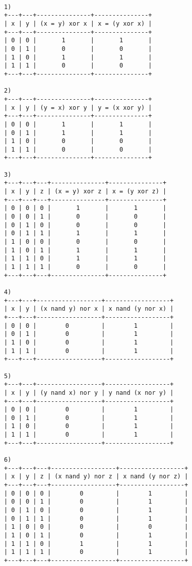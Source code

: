 \documentclass{article}
\begin{document}
\begin{verbatim}

1)
+---+---+---------------+---------------+
| x | y | (x = y) xor x | x = (y xor x) |
+---+---+---------------+---------------+
| 0 | 0 |       1       |       1       |
| 0 | 1 |       0       |       0       |
| 1 | 0 |       1       |       1       |
| 1 | 1 |       0       |       0       |
+---+---+---------------+---------------+

2)
+---+---+---------------+---------------+
| x | y | (y = x) xor y | y = (x xor y) |
+---+---+---------------+---------------+
| 0 | 0 |       1       |       1       |
| 0 | 1 |       1       |       1       |
| 1 | 0 |       0       |       0       |
| 1 | 1 |       0       |       0       |
+---+---+---------------+---------------+

3)
+---+---+---+---------------+---------------+
| x | y | z | (x = y) xor z | x = (y xor z) |
+---+---+---+---------------+---------------+
| 0 | 0 | 0 |       1       |       1       |
| 0 | 0 | 1 |       0       |       0       |
| 0 | 1 | 0 |       0       |       0       |
| 0 | 1 | 1 |       1       |       1       |
| 1 | 0 | 0 |       0       |       0       |
| 1 | 0 | 1 |       1       |       1       |
| 1 | 1 | 0 |       1       |       1       |
| 1 | 1 | 1 |       0       |       0       |
+---+---+---+---------------+---------------+

4)
+---+---+------------------+------------------+
| x | y | (x nand y) nor x | x nand (y nor x) |
+---+---+------------------+------------------+
| 0 | 0 |        0         |        1         |
| 0 | 1 |        0         |        1         |
| 1 | 0 |        0         |        1         |
| 1 | 1 |        0         |        1         |
+---+---+------------------+------------------+

5)
+---+---+------------------+------------------+
| x | y | (y nand x) nor y | y nand (x nor y) |
+---+---+------------------+------------------+
| 0 | 0 |        0         |        1         |
| 0 | 1 |        0         |        1         |
| 1 | 0 |        0         |        1         |
| 1 | 1 |        0         |        1         |
+---+---+------------------+------------------+

6)
+---+---+---+------------------+------------------+
| x | y | z | (x nand y) nor z | x nand (y nor z) |
+---+---+---+------------------+------------------+
| 0 | 0 | 0 |        0         |        1         |
| 0 | 0 | 1 |        0         |        1         |
| 0 | 1 | 0 |        0         |        1         |
| 0 | 1 | 1 |        0         |        1         |
| 1 | 0 | 0 |        0         |        0         |
| 1 | 0 | 1 |        0         |        1         |
| 1 | 1 | 0 |        1         |        1         |
| 1 | 1 | 1 |        0         |        1         |
+---+---+---+------------------+------------------+


\end{verbatim}
\end{document}
